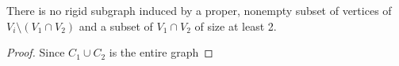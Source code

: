 






\begin{corollary}
There is no rigid subgraph induced by a proper, nonempty subset of vertices of $V_i \setminus (V_1\cap V_2)$ and a subset of $V_1\cap V_2$ of size at least 2.
\end{corollary}

\begin{proof}
Since $C_1\cup C_2$ is the entire graph
\end{proof}







